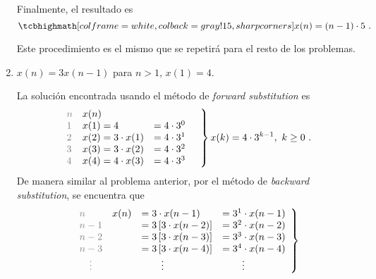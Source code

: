 \begin{enumerate}[label=\textbf{\alph*.}]
\begin{solution}
        Finalmente, el resultado es
        \begin{equation}
            \result{x(n) = \dprod{(n - 1)}{5}\ .}
        \end{equation}

        Este procedimiento es el mismo que se repetirá para el resto de los problemas.
    \end{solution}

    \item $x(n) = 3 x(n-1)$ para $n > 1$, $x(1) = 4$.
    \begin{solution}
        La solución encontrada usando el método de \textit{forward substitution} es
        \begin{equation*}
            \begin{rcases}
                \begin{array}{l l l}
                    \txtgray{n} & x(n) & \\
                    \txtgray{1} & x(1) = 4 & = \dprod{4}{3^0} \\
                    \txtgray{2} & x(2) = \dprod{3}{x(1)} & = \dprod{4}{3^1} \\
                    \txtgray{3} & x(3) = \dprod{3}{x(2)} & = \dprod{4}{3^2} \\
                    \txtgray{4} & x(4) = \dprod{4}{x(3)} & = \dprod{4}{3^3}
                \end{array} \quad
            \end{rcases}
            x(k) = \dprod{4}{3^{k - 1}},\ k \geq 0\ .
        \end{equation*}
        De manera similar al problema anterior, por el método de \textit{backward substitution}, se encuentra que
        \begin{equation*}
            \begin{rcases}
                \begin{array}{l l l l}
                    \txtgray{n} & x(n) & = \dprod{3}{x(n - 1)} & = \dprod{3^1}{x(n - 1)} \\
                    \txtgray{n - 1} & & = 3 \left[ \dprod{3}{x(n - 2)} \right] & = \dprod{3^2}{x(n - 2)} \\
                    \txtgray{n - 2} & & = 3 \left[ \dprod{3}{x(n - 3)} \right] & = \dprod{3^3}{x(n - 3)} \\
                    \txtgray{n - 3} & & = 3 \left[ \dprod{3}{x(n - 4)} \right] & = \dprod{3^4}{x(n - 4)} \\
                    \quad\txtgray\vdots & & \qquad \vdots & \qquad \vdots

\end{array}
\end{rcases}
\end{equation*}
\end{solution}
\end{enumerate}
